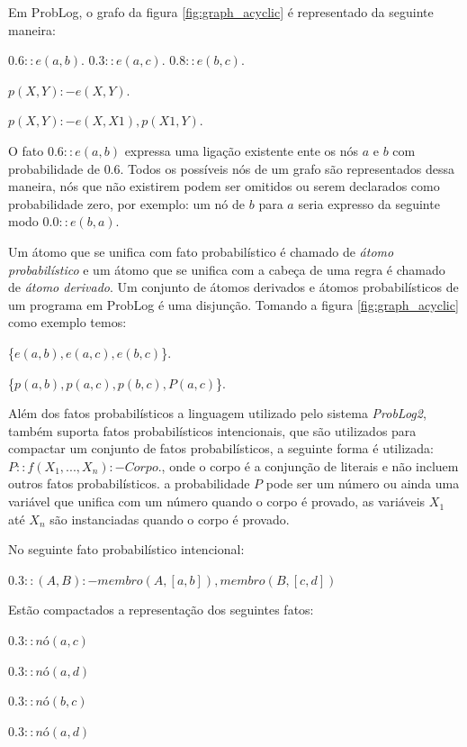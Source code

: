 \documentclass[
	12pt,				%
    oneside,			%
	a4paper,			%
	english,			%
	french,				%
	spanish,			%
	brazil,				%
	]{abntex2}
\begin{document}
Em ProbLog, o grafo da figura \ref{fig:graph_acyclic} é representado da seguinte maneira:

$0.6::e(a, b).  $ $0.3::e(a, c).  $ $0.8::e(b, c).$ \newline

$p(X, Y) :- e(X, Y). $ \newline

$p(X, Y) :- e(X, X1), p(X1, Y). $ \newline

O fato $0.6::e(a, b)$ expressa uma ligação existente ente os nós $a$ e $b$ com probabilidade de $0.6$. Todos os possíveis nós de um grafo são representados dessa maneira, nós que não existirem podem ser omitidos ou serem declarados como probabilidade zero, por exemplo: um nó de $b$ para $a$ seria expresso da seguinte modo $0.0::e(b, a)$.

Um átomo que se unifica com fato probabilístico é chamado de \textit{átomo probabilístico} e um átomo que se unifica com a cabeça de uma regra é chamado de \textit{átomo derivado}. Um conjunto de átomos derivados e átomos probabilísticos de um programa em ProbLog é uma disjunção. Tomando a figura \ref{fig:graph_acyclic} como exemplo temos:

\{$e(a, b), e(a, c), e(b, c)$\}.\newline

\{$p(a, b), p(a, c), p(b, c), P(a, c)$\}.\newline

Além dos fatos probabilísticos a linguagem utilizado pelo sistema \textit{ProbLog2}, também suporta fatos probabilísticos intencionais, que são utilizados para compactar um conjunto de fatos probabilísticos, a seguinte forma é utilizada: $P :: f(X_1,...,X_n):- Corpo.$, onde o corpo é a conjunção de literais e não incluem outros fatos probabilísticos. a probabilidade $P$ pode ser um número ou ainda uma variável que unifica com um número quando o corpo é provado, as variáveis $X_1$ até $X_n$ são instanciadas quando o corpo é provado.

No seguinte fato probabilístico intencional:

$0.3::(A, B) :- membro(A, [a, b]), membro(B, [c,d])$

Estão compactados a representação dos seguintes fatos:

$0.3::nó(a, c)$

$0.3::nó(a, d)$

$0.3::nó(b, c)$

$0.3::nó(a, d)$
\end{document}
